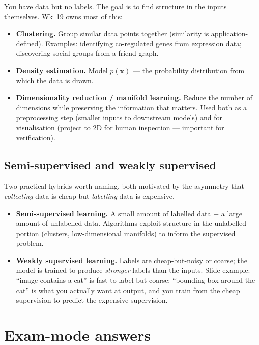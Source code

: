 \documentclass[11pt, a4paper]{article}
\begin{document}
You have data but no labels. The goal is to find structure in the inputs themselves. Wk~19 owns most of this:

\begin{itemize}
  \item \textbf{Clustering.} Group similar data points together (similarity is application-defined). Examples: identifying co-regulated genes from expression data; discovering social groups from a friend graph.
  \item \textbf{Density estimation.} Model $p(\mathbf{x})$ — the probability distribution from which the data is drawn.
  \item \textbf{Dimensionality reduction / manifold learning.} Reduce the number of dimensions while preserving the information that matters. Used both as a preprocessing step (smaller inputs to downstream models) and for visualisation (project to 2D for human inspection — important for verification).
\end{itemize}

\subsection{Semi-supervised and weakly supervised}

Two practical hybrids worth naming, both motivated by the asymmetry that \emph{collecting} data is cheap but \emph{labelling} data is expensive.

\begin{itemize}
  \item \textbf{Semi-supervised learning.} A small amount of labelled data + a large amount of unlabelled data. Algorithms exploit structure in the unlabelled portion (clusters, low-dimensional manifolds) to inform the supervised problem.
  \item \textbf{Weakly supervised learning.} Labels are cheap-but-noisy or coarse; the model is trained to produce \emph{stronger} labels than the inputs. Slide example: ``image contains a cat'' is fast to label but coarse; ``bounding box around the cat'' is what you actually want at output, and you train from the cheap supervision to predict the expensive supervision.
\end{itemize}

\section*{Exam-mode answers}
\end{document}
